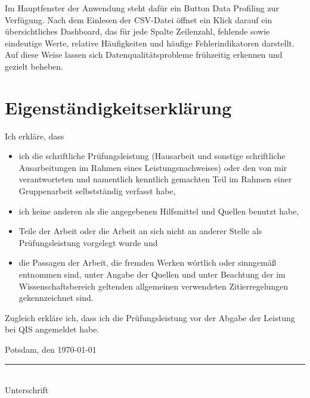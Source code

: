 \documentclass[
    a4paper,
    12pt,
    headinclude=true,
    BCOR=10mm,
]{scrreprt}
\begin{document}
Im Hauptfenster der Anwendung steht dafür ein Button \glqq Data Profiling\grqq{} zur Verfügung. Nach dem Einlesen der CSV-Datei öffnet ein Klick darauf ein übersichtliches Dashboard, das für jede Spalte Zeilenzahl, fehlende sowie eindeutige Werte, relative Häufigkeiten und häufige Fehlerindikatoren darstellt. Auf diese Weise lassen sich Datenqualitätsprobleme frühzeitig erkennen und gezielt beheben.

\newpage
{}
\chapter*{Eigenständigkeitserklärung}
Ich erkläre, dass
\begin{itemize}
    \item ich die schriftliche Prüfungsleistung (Hausarbeit und sonstige schriftliche Ausarbeitungen im Rahmen eines Leistungsnachweises) oder den von mir verantworteten und namentlich kenntlich gemachten Teil im Rahmen einer Gruppenarbeit selbstständig verfasst habe,
    \item ich keine anderen als die angegebenen Hilfsmittel und Quellen benutzt habe,
    \item Teile der Arbeit oder die Arbeit an sich nicht an anderer Stelle als Prüfungsleistung vorgelegt wurde und
    \item die Passagen der Arbeit, die fremden Werken wörtlich oder sinngemäß entnommen sind, unter Angabe der Quellen und unter Beachtung der im Wissenschaftsbereich geltenden allgemeinen verwendeten Zitierregelungen gekennzeichnet sind.
\end{itemize}

Zugleich erkläre ich, dass ich die Prüfungsleistung vor der Abgabe der Leistung bei QIS angemeldet habe.

\vspace{2cm}

\noindent
Potsdam, den \today

\vspace{2cm}

\noindent
\rule{6cm}{0.4pt}\\
Unterschrift

\printbibliography
\newpage
\appendix
\end{document}
